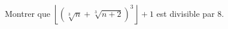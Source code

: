 Montrer que $\left\lfloor \left(\sqrt[3]{n} + \sqrt[3]{n + 2}\right)^3 \right\rfloor + 1$ est divisible par $8$.
